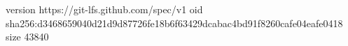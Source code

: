 version https://git-lfs.github.com/spec/v1
oid sha256:d3468659040d21d9d87726fe18b6f63429dcabac4bd91f8260cafe04eafe0418
size 43840
